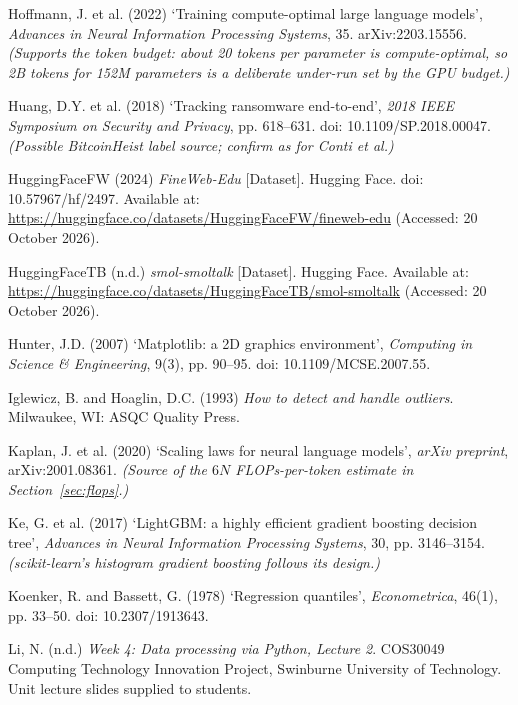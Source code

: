 \begin{references}
\item Hoffmann, J. et al. (2022) ‘Training compute-optimal large language models’, \textit{Advances in Neural Information Processing Systems}, 35. arXiv:2203.15556. \emph{(Supports the token budget: about 20 tokens per parameter is compute-optimal, so 2B tokens for 152M parameters is a deliberate under-run set by the GPU budget.)}

\item Huang, D.Y. et al. (2018) ‘Tracking ransomware end-to-end’, \textit{2018 IEEE Symposium on Security and Privacy}, pp. 618–631. doi: 10.1109/SP.2018.00047. \emph{(Possible BitcoinHeist label source; confirm as for Conti et al.)}

\item HuggingFaceFW (2024) \textit{FineWeb-Edu} [Dataset]. Hugging Face. doi: 10.57967/hf/2497. Available at: \url{https://huggingface.co/datasets/HuggingFaceFW/fineweb-edu} (Accessed: 20 October 2026). \textdagger

\item HuggingFaceTB (n.d.) \textit{smol-smoltalk} [Dataset]. Hugging Face. Available at: \url{https://huggingface.co/datasets/HuggingFaceTB/smol-smoltalk} (Accessed: 20 October 2026). \textdagger

\item Hunter, J.D. (2007) ‘Matplotlib: a 2D graphics environment’, \textit{Computing in Science \& Engineering}, 9(3), pp. 90–95. doi: 10.1109/MCSE.2007.55.

\item Iglewicz, B. and Hoaglin, D.C. (1993) \textit{How to detect and handle outliers}. Milwaukee, WI: ASQC Quality Press. \textdaggerdbl

\item Kaplan, J. et al. (2020) ‘Scaling laws for neural language models’, \textit{arXiv preprint}, arXiv:2001.08361. \emph{(Source of the $6N$ FLOPs-per-token estimate in Section~\ref{sec:flops}.)}

\item Ke, G. et al. (2017) ‘LightGBM: a highly efficient gradient boosting decision tree’, \textit{Advances in Neural Information Processing Systems}, 30, pp. 3146–3154. \emph{(scikit-learn's histogram gradient boosting follows its design.)}

\item Koenker, R. and Bassett, G. (1978) ‘Regression quantiles’, \textit{Econometrica}, 46(1), pp. 33–50. doi: 10.2307/1913643.

\item Li, N. (n.d.) \textit{Week 4: Data processing via Python, Lecture 2}. COS30049 Computing Technology Innovation Project, Swinburne University of Technology. Unit lecture slides supplied to students.


\end{references}
